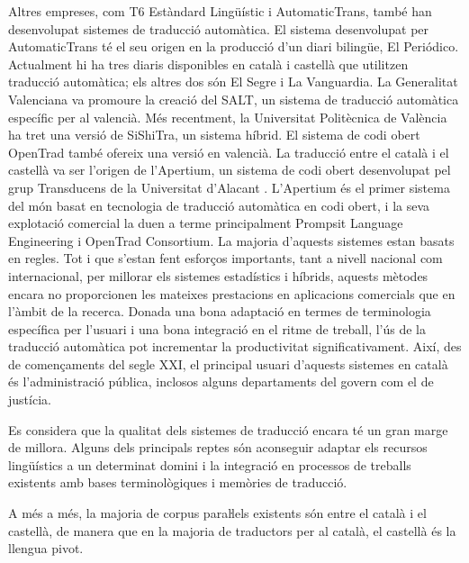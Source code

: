 \begin{multicols}{2}
Altres empreses, com T6 Estàndard Lingüístic i AutomaticTrans, també han desenvolupat sistemes de traducció automàtica. El sistema desenvolupat per AutomaticTrans té el seu origen en la producció d’un diari bilingüe, El Periódico. Actualment hi ha tres diaris disponibles en català i castellà que utilitzen traducció automàtica; els altres dos són El Segre i La Vanguardia. La Generalitat Valenciana va promoure la creació del SALT, un sistema de traducció automàtica específic per al valencià. Més recentment, la Universitat Politècnica de València ha tret una versió de SiShiTra, un sistema híbrid. El sistema de codi obert OpenTrad també ofereix una versió en valencià. La traducció entre el català i el castellà va ser l’origen de l’Apertium, un sistema de codi obert desenvolupat pel grup Transducens \cite{CAT-transducens} de la Universitat d’Alacant \cite{CAT-UnivAlacant}. L’Apertium és el primer sistema del món basat en tecnologia de traducció automàtica en codi obert, i la seva explotació comercial la duen a terme principalment Prompsit Language Engineering i OpenTrad Consortium. La majoria d’aquests sistemes estan basats en regles. Tot i que s’estan fent esforços importants, tant a nivell nacional com internacional, per millorar els sistemes estadístics i híbrids, aquests mètodes encara no proporcionen les mateixes prestacions en aplicacions comercials que en l’àmbit de la recerca. Donada una bona adaptació en termes de terminologia específica per l’usuari i una bona integració en el ritme de treball, l’ús de la traducció automàtica pot incrementar la productivitat significativament. Així, des de començaments del segle XXI, el principal usuari d’aquests sistemes en català és l’administració pública, inclosos alguns departaments del govern com el de justícia.

Es considera que la qualitat dels sistemes de traducció encara té un gran marge de millora. Alguns dels principals reptes són aconseguir adaptar els recursos lingüístics a un determinat domini i la integració en processos de treballs existents amb bases terminològiques i memòries de traducció.

A més a més, la majoria de corpus paraŀlels existents són entre el català i el castellà, de manera que en la majoria de traductors per al català, el castellà és la llengua pivot.


\end{multicols}

